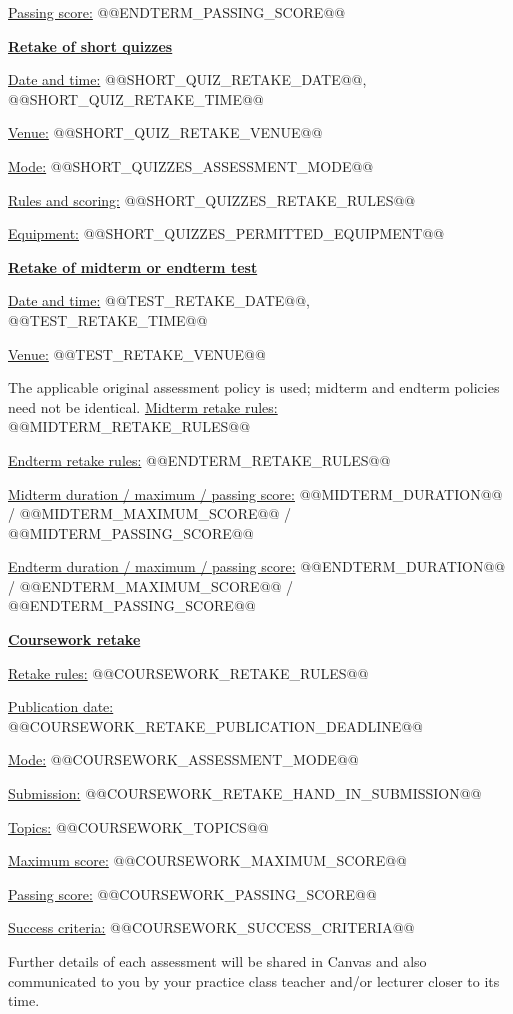 \documentclass[11pt,a4paper]{article}
\newcommand{\assessment}[1]{\par\medskip\textbf{\underline{#1}}\par}
\newcommand{\field}[2]{\underline{#1:} #2\par}
\begin{document}
\field{Passing score}{@@ENDTERM_PASSING_SCORE@@}
\assessment{Retake of short quizzes}
\field{Date and time}{@@SHORT_QUIZ_RETAKE_DATE@@, @@SHORT_QUIZ_RETAKE_TIME@@}
\field{Venue}{@@SHORT_QUIZ_RETAKE_VENUE@@}
\field{Mode}{@@SHORT_QUIZZES_ASSESSMENT_MODE@@}
\field{Rules and scoring}{@@SHORT_QUIZZES_RETAKE_RULES@@}
\field{Equipment}{@@SHORT_QUIZZES_PERMITTED_EQUIPMENT@@}

\assessment{Retake of midterm or endterm test}
\field{Date and time}{@@TEST_RETAKE_DATE@@, @@TEST_RETAKE_TIME@@}
\field{Venue}{@@TEST_RETAKE_VENUE@@}
The applicable original assessment policy is used; midterm and endterm policies need not be identical.
\field{Midterm retake rules}{@@MIDTERM_RETAKE_RULES@@}
\field{Endterm retake rules}{@@ENDTERM_RETAKE_RULES@@}
\field{Midterm duration / maximum / passing score}{@@MIDTERM_DURATION@@ / @@MIDTERM_MAXIMUM_SCORE@@ / @@MIDTERM_PASSING_SCORE@@}
\field{Endterm duration / maximum / passing score}{@@ENDTERM_DURATION@@ / @@ENDTERM_MAXIMUM_SCORE@@ / @@ENDTERM_PASSING_SCORE@@}

\newpage
\assessment{Coursework retake }
\field{Retake rules}{@@COURSEWORK_RETAKE_RULES@@}
\field{Publication date}{@@COURSEWORK_RETAKE_PUBLICATION_DEADLINE@@}
\field{Mode}{@@COURSEWORK_ASSESSMENT_MODE@@}
\field{Submission}{@@COURSEWORK_RETAKE_HAND_IN_SUBMISSION@@}
\field{Topics}{@@COURSEWORK_TOPICS@@}
\field{Maximum score}{@@COURSEWORK_MAXIMUM_SCORE@@}
\field{Passing score}{@@COURSEWORK_PASSING_SCORE@@}
\field{Success criteria}{@@COURSEWORK_SUCCESS_CRITERIA@@}
\bigskip
Further details of each assessment will be shared in Canvas and also communicated to you by your practice class teacher and/or lecturer closer to its time.
\end{document}
